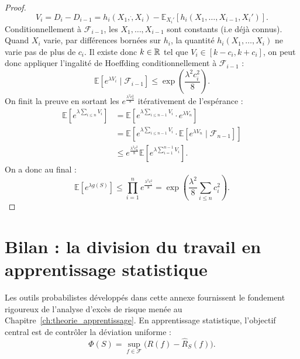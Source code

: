 \begin{proof}
    $$
        V_i = D_i - D_{i-1} = h_i(X_1, \dot, X_i) - \mathbb{E}_{X_i'}\left[ h_i(X_1, \dots, X_{i-1}, X_i') \right]. 
    $$
    Conditionnellement à $ \mathcal{F}_{i-1}$, les $X_1, \dots, X_{i-1}$ sont constants (i.e déjà connus). Quand $X_i$ varie, par différences bornées sur $h_i$, la quantité $h_i(X_1, \dots, X_i)$ ne varie pas de plus de $c_i$. Il existe donc $k \in \mathbb{R}$ tel que $ V_i \in [k - c_i, k + c_i]$, on peut donc appliquer l'ingalité de Hoeffding conditionnellement à $ \mathcal{F}_{i-1}$ :
    $$  
        \mathbb{E}\left[ e^{ \lambda V_i} \mid \mathcal{F}_{i-1} \right] \leqslant \exp \left( \frac{ \lambda^2 c_i^2}{8}\right). 
    $$
    On finit la preuve en sortant les $ e^{ \frac{ \lambda^2 c_n^2}{8}}$ itérativement de l'espérance : 
    \begin{align*}
        \mathbb{E} \left[ e^{ \lambda \sum_{i \leqslant n} V_i}\right] 
        &= \mathbb{E} \left[ e^{ \lambda \sum_{i \leqslant n-1} V_i} \cdot e^{ \lambda V_n} \right] \\ 
        &= \mathbb{E} \left[ e^{ \lambda \sum_{i \leqslant n-1} V_i} \cdot \mathbb{E} \left[ e^{ \lambda V_n} \mid \mathcal{F}_{n-1}\right]\right] \\ 
        &\leqslant e^{ \frac{ \lambda ^2 c_n^2}{8}} \mathbb{E} \left[ e^{ \lambda \sum_{i=1}^{n-1} V_i} \right]. 
    \end{align*}
    On a donc au final : 
    $$ 
        \mathbb{E}\left[ e^{ \lambda g(S)}\right] \leqslant \prod_{i=1}^{n} e^{ \frac{\lambda^2 c_i^2}{8}} = \exp \left( \frac{ \lambda^2}{8} \sum_{i \leqslant n} c_i^2\right). 
    $$
\end{proof}


\section{Bilan : la division du travail en apprentissage statistique}

Les outils probabilistes développés dans cette annexe fournissent le fondement rigoureux de l'analyse d'excès de risque menée au Chapitre~\ref{ch:theorie_apprentissage}. En apprentissage statistique, l'objectif central est de contrôler la déviation uniforme :
\begin{equation}
    \Phi(S) = \sup_{f \in \mathcal{F}} \big( R(f) - \hat{R}_S(f) \big).
\end{equation}

